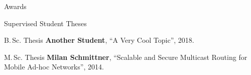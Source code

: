 \begin{cv}{}
\begin{cvlist}{{Awards}}
\end{cvlist}        


\begin{cvlist}{{Supervised Student Theses}}

\item[B.\,Sc. Thesis] \textbf{Another Student}, \enquote{A Very Cool Topic}, 2018.

\item[M.\,Sc. Thesis] \textbf{Milan Schmittner}, \enquote{Scalable and Secure Multicast Routing for Mobile Ad-hoc Networks}, 2014.

\end{cvlist}






\date{\myLocation{}, \myTime{}}

\end{cv}
